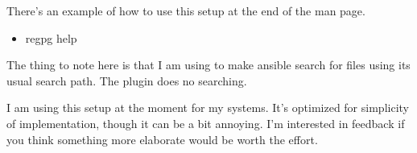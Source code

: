 {  There's an example of how to use this setup at the end of the \regpg
  man page.

  \begin{itemize}
  \item regpg help
  \end{itemize}

  The thing to note here is that I am using
   to make ansible search for files using
  its usual search path. The  plugin does no
  searching.

  I am using this setup at the moment for my systems. It's optimized
  for simplicity of implementation, though it can be a bit annoying.
  I'm interested in feedback if you think something more elaborate
  would be worth the effort.

}



